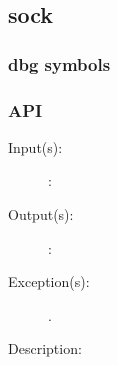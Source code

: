 %
%
%
%
%              

\subsection{sock}
\label{sock}

\subsubsection{dbg symbols}

\subsubsection{API}
\begin{description}
\label{sock_}
\item[{\cfunc[]{sock\_}{}}: ]
	\begin{description}\item[]
	\item[Input(s): ]
		\begin{description}\item[]
		\item[: ]
		\end{description}
	\item[Output(s): ]
		\begin{description}\item[]
		\item[: ]
		\end{description}
	\item[Exception(s): ]
		\begin{description}\item[]
		\item[.]
		\end{description}
	\item[Description: ]
	\end{description}
\end{description}
